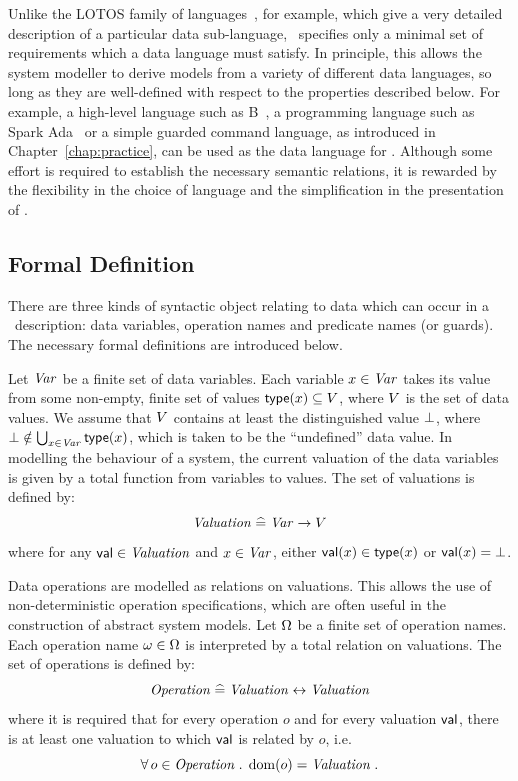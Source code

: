 Unlike the LOTOS family of languages~\cite{lot:88,lot:98,lot:98a}, for
example, which give a very detailed description of a particular data
sub-language, \bcandle\ specifies only a minimal set of requirements which
a data language must satisfy. In principle, this allows the system
modeller to derive models from a variety of different data languages,
so long as they are well-defined with respect to the properties 
described below. For example, a high-level language such as B~\cite{abr:96},
a programming language such as Spark Ada~\cite{bar:96} or a simple guarded 
command language, as introduced in Chapter~\ref{chap:practice}, can
be used as the data language for \bcandle. Although some effort is 
required to establish the necessary semantic relations, it is rewarded
by the flexibility in the choice of language and the simplification
in the presentation of \bcandle. 

\subsection{Formal Definition}\label{ss:bcformaldata}
There are three kinds of syntactic object
relating to data which can occur in a \bcandle\ description: data variables,
operation names and predicate names (or guards). The necessary formal
definitions are introduced below.

Let ${\text{\it Var\/}}$ be a finite set of data variables. Each variable $x \in
{\text{\it Var\/}}$ takes its value from some non-empty, finite set of values
$\mathop{\sf type}(x) \subseteq V$, where $V$ is the set of data
values. We assume that $V$ contains at least the distinguished value
$\bot$, where $\bot \notin \bigcup_{x \in {\text{\it Var\/}}} \mathop{\sf type}(x)$, 
which is taken to be the ``undefined'' data value.
In modelling the behaviour of a system, the current valuation
of the data variables is given by a total function from variables to
values. The set of valuations is defined by:
\[ {\text{\it Valuation\/}} \mathrel{\widehat=} {\text{\it Var\/}} \rightarrow V \]
where for any ${\mathop{\sf val}} \in {\text{\it Valuation\/}}$ and $x \in {\text{\it Var\/}}$, either
${\mathop{\sf val}}(x) \in \mathop{\sf type}(x)$ or ${\mathop{\sf val}}(x) = \bot$.

Data operations are modelled as relations on valuations. This allows
the use of non-deterministic operation specifications, which are often
useful in the construction of abstract system models. Let $\Omega$ be a
finite set of operation names.  Each operation name $\omega \in
\Omega$ is interpreted by a total relation on valuations. The set of
operations is defined by:
\[ {\text{\it Operation\/}} \mathrel{\widehat=} {\text{\it Valuation\/}} \leftrightarrow {\text{\it Valuation\/}} \]
where it is required that for every operation $o$ and for every
valuation ${\mathop{\sf val}}$, there is at least one valuation to which ${\mathop{\sf val}}$ is
related by $o$, i.e. 
\[ \forall o \in \operation \such \dom(o) = \valuation\;.\]


